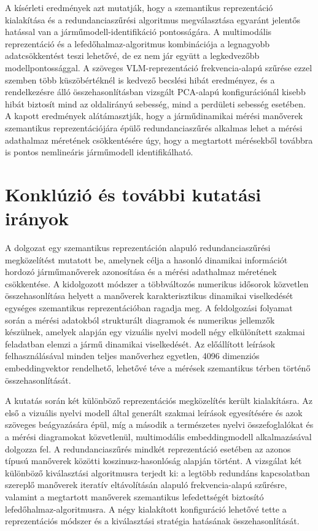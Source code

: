 \documentclass[12pt,a4paper,onehalfspacing, oneside]{book} %
\begin{document}
A kísérleti eredmények azt mutatják, hogy a szemantikus reprezentáció kialakítása és a redundanciaszűrési algoritmus megválasztása egyaránt jelentős hatással van a járműmodell-identifikáció pontosságára. A multimodális reprezentáció és a lefedőhalmaz-algoritmus kombinációja a legnagyobb adatcsökkentést teszi lehetővé, de ez nem jár együtt a legkedvezőbb modellpontossággal. A szöveges VLM-reprezentáció frekvencia-alapú szűrése ezzel szemben több küszöbértéknél is kedvező becslési hibát eredményez, és a rendelkezésre álló összehasonlításban vizsgált PCA-alapú konfigurációnál kisebb hibát biztosít mind az oldalirányú sebesség, mind a perdületi sebesség esetében. A kapott eredmények alátámasztják, hogy a járműdinamikai mérési manőverek szemantikus reprezentációjára épülő redundanciaszűrés alkalmas lehet a mérési adathalmaz méretének csökkentésére úgy, hogy a megtartott mérésekből továbbra is pontos nemlineáris járműmodell identifikálható.

\chapter{Konklúzió és további kutatási irányok}\label{ch:konkluzio}
A dolgozat egy szemantikus reprezentáción alapuló redundanciaszűrési megközelítést mutatott be, amelynek célja a hasonló dinamikai információt hordozó járműmanőverek azonosítása és a mérési adathalmaz méretének csökkentése. A kidolgozott módszer a többváltozós numerikus idősorok közvetlen összehasonlítása helyett a manőverek karakterisztikus dinamikai viselkedését egységes szemantikus reprezentációban ragadja meg. A feldolgozási folyamat során a mérési adatokból strukturált diagramok és numerikus jellemzők készülnek, amelyek alapján egy vizuális nyelvi modell négy elkülönített szakmai feladatban elemzi a jármű dinamikai viselkedését. Az előállított leírások felhasználásával minden teljes manőverhez egyetlen, 4096 dimenziós embeddingvektor rendelhető, lehetővé téve a mérések szemantikus térben történő összehasonlítását.

A kutatás során két különböző reprezentációs megközelítés került kialakításra. Az első a vizuális nyelvi modell által generált szakmai leírások egyesítésére és azok szöveges beágyazására épül, míg a második a természetes nyelvi összefoglalókat és a mérési diagramokat közvetlenül, multimodális embeddingmodell alkalmazásával dolgozza fel. A redundanciaszűrés mindkét reprezentáció esetében az azonos típusú manőverek közötti koszinusz-hasonlóság alapján történt. A vizsgálat két különböző kiválasztási algoritmusra terjedt ki: a legtöbb redundáns kapcsolatban szereplő manőverek iteratív eltávolításán alapuló frekvencia-alapú szűrésre, valamint a megtartott manőverek szemantikus lefedettségét biztosító lefedőhalmaz-algoritmusra. A négy kialakított konfiguráció lehetővé tette a reprezentációs módszer és a kiválasztási stratégia hatásának összehasonlítását.
\end{document}
